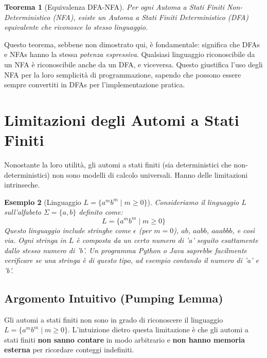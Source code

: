 \documentclass[a4paper, 11pt]{book} %
\newtheorem{theorem}{Teorema}[section]
\newtheorem{example}[theorem]{Esempio}
\theoremstyle{definition}
\begin{document}
\begin{theorem}[Equivalenza DFA-NFA]
Per ogni Automa a Stati Finiti Non-Deterministico (NFA), esiste un Automa a Stati Finiti Deterministico (DFA) equivalente che riconosce lo stesso linguaggio.
\end{theorem}
Questo teorema, sebbene non dimostrato qui, è fondamentale: significa che DFAs e NFAs hanno la stessa \emph{potenza espressiva}. Qualsiasi linguaggio riconoscibile da un NFA è riconoscibile anche da un DFA, e viceversa. Questo giustifica l'uso degli NFA per la loro semplicità di programmazione, sapendo che possono essere sempre convertiti in DFAs per l'implementazione pratica.

\section{Limitazioni degli Automi a Stati Finiti}
Nonostante la loro utilità, gli automi a stati finiti (sia deterministici che non-deterministici) non sono modelli di calcolo universali. Hanno delle limitazioni intrinseche.

\begin{example}[Linguaggio $L = \{a^m b^m \mid m \geq 0\}$]
Consideriamo il linguaggio $L$ sull'alfabeto $\Sigma = \{a, b\}$ definito come:
\[ L = \{a^m b^m \mid m \geq 0\} \]
Questo linguaggio include stringhe come $\epsilon$ (per $m=0$), $ab$, $aabb$, $aaabbb$, e così via. Ogni stringa in $L$ è composta da un certo numero di 'a' seguito esattamente dallo stesso numero di 'b'.
Un programma Python o Java saprebbe facilmente verificare se una stringa è di questo tipo, ad esempio contando il numero di 'a' e 'b'.
\end{example}

\subsection{Argomento Intuitivo (Pumping Lemma)}
Gli automi a stati finiti non sono in grado di riconoscere il linguaggio $L = \{a^m b^m \mid m \geq 0\}$. L'intuizione dietro questa limitazione è che gli automi a stati finiti \textbf{non sanno contare} in modo arbitrario e \textbf{non hanno memoria esterna} per ricordare conteggi indefiniti.
\end{document}
